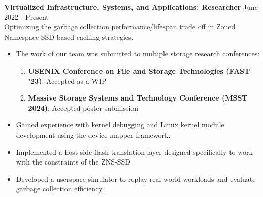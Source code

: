 \textbf{Virtualized Infrastructure, Systems, and Applications: Researcher} \hfill June 2022 - Present\\
Optimizing the garbage collection performance/lifespan trade off in Zoned Namespace SSD-based caching strategies.
\begin{itemize}
    \item{The work of our team was submitted to multiple storage research conferences:}
    \begin{enumerate}
        \item \textbf{USENIX Conference on File and Storage Technologies (FAST '23)}: Accepted as a WIP
        \item \textbf{Massive Storage Systems and Technology Conference (MSST 2024)}: Accepted poster submission
    \end{enumerate}
    \item{Gained experience with kernel debugging and Linux kernel module development using the device mapper framework.}
    \item{Implemented a host-side flash translation layer designed specifically to work with the constraints of the ZNS-SSD}
    \item{Developed a userspace simulator to replay real-world workloads and evaluate garbage collection efficiency.}
\end{itemize}
